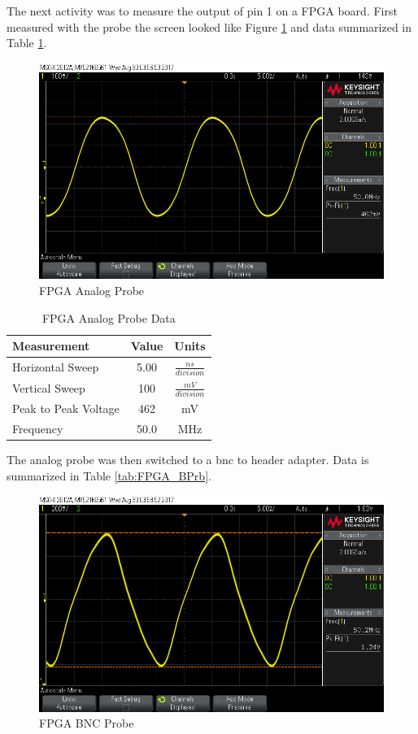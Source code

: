 \documentclass[journal,onecolumn]{IEEEtran}
\begin{document}
The next activity was to measure the output of pin 1 on a FPGA board. First measured with the probe the screen looked like Figure \ref{fig:srpb} and data summarized in Table \ref{tab:FPGA_APrb}.
\begin{figure}[H]
	\includegraphics[width=18cm]{probe_sine.png}
	\centering
	\caption{FPGA Analog Probe}
	\label{fig:srpb}
\end{figure}
\begin{table}[H]
	\centering
	\caption{FPGA Analog Probe Data}
	\label{tab:FPGA_APrb}
	\begin{tabular}{|l|c|c|}
		\hline
		\textbf{Measurement} & \textbf{Value} & \textbf{Units}                        \\ \hline
		\rule{0pt}{4ex}  Horizontal Sweep     & 5.00            & $\frac{ns}{division}$ \\ \hline
		\rule{0pt}{4ex}  Vertical Sweep       & 100            & $\frac{mV}{division}$  \\ \hline
		\rule{0pt}{4ex}  Peak to Peak Voltage & 462            & mV                      \\ \hline
		\rule{0pt}{4ex}  Frequency            & 50.0           & MHz                      \\ \hline
	\end{tabular}
\end{table}
\newpage
The analog probe was then switched to a bnc to header adapter. Data is summarized in Table \ref{tab:FPGA_BPrb}.
\begin{figure}[H]
	\includegraphics[width=18cm]{bnc_sine.png}
	\centering
	\caption{FPGA BNC Probe}
	\label{fig:sbnc}
\end{figure}
\end{document}
